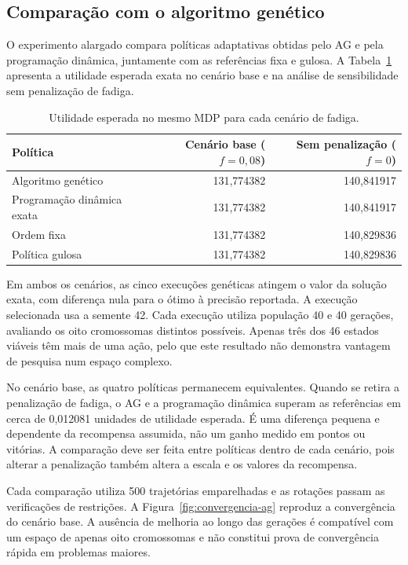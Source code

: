 \subsection{Comparação com o algoritmo genético}

O experimento alargado compara políticas adaptativas obtidas pelo AG e
pela programação dinâmica, juntamente com as referências fixa e gulosa.
A Tabela~\ref{tab:genetico} apresenta a utilidade esperada exata no cenário
base e na análise de sensibilidade sem penalização de fadiga.

\begin{table}[htbp]
\centering
\caption{Utilidade esperada no mesmo MDP para cada cenário de fadiga.}
\label{tab:genetico}
\begin{tabular}{lrr}
\toprule
Política & Cenário base (\(f=0{,}08\)) & Sem penalização (\(f=0\))\\
\midrule
Algoritmo genético & 131,774382 & 140,841917\\
Programação dinâmica exata & 131,774382 & 140,841917\\
Ordem fixa & 131,774382 & 140,829836\\
Política gulosa & 131,774382 & 140,829836\\
\bottomrule
\end{tabular}
\end{table}

Em ambos os cenários, as cinco execuções genéticas atingem o valor da
solução exata, com diferença nula para o ótimo à precisão reportada.
A execução selecionada usa a semente 42. Cada execução utiliza população
40 e 40 gerações, avaliando os oito cromossomas distintos possíveis.
Apenas três dos 46 estados viáveis têm mais de uma ação, pelo que este
resultado não demonstra vantagem de pesquisa num espaço complexo.

No cenário base, as quatro políticas permanecem equivalentes. Quando se
retira a penalização de fadiga, o AG e a programação dinâmica superam as
referências em cerca de 0,012081 unidades de utilidade esperada. É uma
diferença pequena e dependente da recompensa assumida, não um ganho
medido em pontos ou vitórias. A comparação deve ser feita entre políticas
dentro de cada cenário, pois alterar a penalização também altera a escala
e os valores da recompensa.

Cada comparação utiliza 500 trajetórias emparelhadas e as rotações passam
as verificações de restrições. A Figura~\ref{fig:convergencia-ag} reproduz
a convergência do cenário base. A ausência de melhoria ao longo das gerações
é compatível com um espaço de apenas oito cromossomas e não constitui
prova de convergência rápida em problemas maiores.

